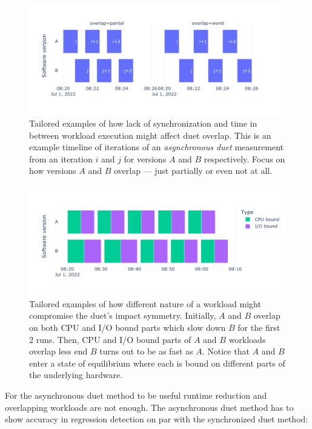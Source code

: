\begin{figure}[!ht]
	\centering
	\includegraphics[width=.9\linewidth]{./figures/overlap_timeline.pdf}
	\caption{
		Tailored examples of how lack of synchronization and time in between workload execution might affect duet overlap.
		This is an example timeline of iterations of an \emph{asynchronous duet} measurement from an iteration $i$ and $j$ for versions $A$ and $B$ respectively.
		Focus on how versions $A$ and $B$ overlap --- just partially or even not at all.
	}
	\label{fig:overlap_timeline}
\end{figure}

\begin{figure}[!ht]
	\centering
	\includegraphics[width=.9\linewidth]{./figures/overlap_interference.pdf}
	\caption{
		Tailored examples of how different nature of a workload might compromise the duet's impact symmetry.
		Initially, $A$ and $B$ overlap on both CPU and I/O bound parts which slow down $B$ for the first 2 runs.
		Then, CPU and I/O bound parts of $A$ and $B$ workloads overlap less end $B$ turns out to be as fast as $A$.
		Notice that $A$ and $B$ enter a state of equilibrium where each is bound on different parts of the underlying hardware.
	}
	\label{fig:overlap_interference}
\end{figure}

For the asynchronous duet method to be useful runtime reduction and overlapping workloads are not enough.
The asynchronous duet method has to show accuracy in regression detection on par with the synchronized duet method:

